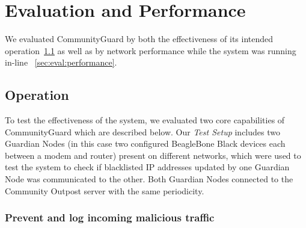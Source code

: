 \section{Evaluation and Performance}
\label{sec:eval}

We evaluated CommunityGuard by both the effectiveness of its intended operation~\ref{sec:eval:operation} as well as by network performance while the system was running in-line ~\ref{sec:eval:performance}.  


\subsection{Operation}
\label{sec:eval:operation}

To test the effectiveness of the system, we evaluated two core capabilities of CommunityGuard which are described below.
Our \textit{Test Setup} includes two Guardian Nodes (in this case two configured BeagleBone Black devices each between a modem and router) present on different networks, which were used to test the system to check if blacklisted IP addresses updated by one Guardian Node  was communicated to the other. Both Guardian Nodes connected to the Community Outpost server with the same periodicity.

\subsubsection{Prevent and log incoming malicious traffic}
\label{sec:eval:preventout}

